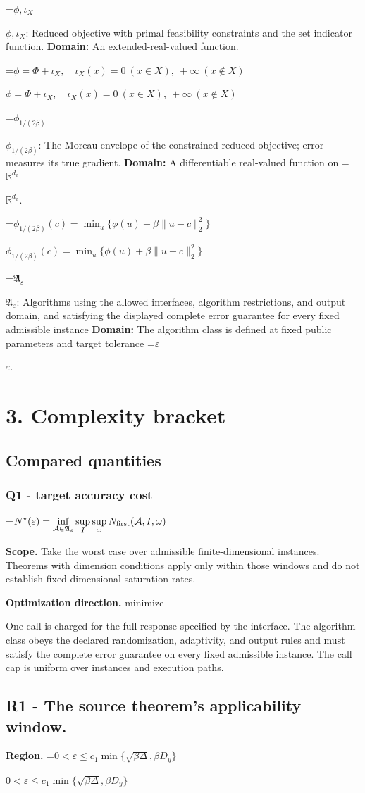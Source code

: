 \documentclass[10pt,a4paper]{article}
\newcommand{\AtlasMath}[1]{\par\begingroup\centering\setbox0=\hbox{$\displaystyle #1$}\ifdim\wd0>1.4\linewidth\typeout{ATLAS WIDE FORMULA: \the\wd0}\fi\ifdim\wd0>\linewidth\resizebox{\linewidth}{!}{\box0}\else\box0\fi\par\endgroup}
\newcommand{\AtlasInlineMath}[1]{\begingroup\setbox0=\hbox{$#1$}\ifdim\wd0>.4\linewidth\endgroup\AtlasMath{#1}\else\endgroup$#1$\fi}
\begin{document}
\AtlasInlineMath{\phi,\iota_X}: Reduced objective with primal feasibility constraints and the set indicator function. \textbf{Domain:} An extended-real-valued function.

\AtlasInlineMath{\phi=\Phi+\iota_X,\quad\iota_X(x)=0\ (x\in X),\ +\infty\ (x\notin X)}

\AtlasInlineMath{\phi_{1/(2\beta)}}: The Moreau envelope of the constrained reduced objective; error measures its true gradient. \textbf{Domain:} A differentiable real-valued function on \AtlasInlineMath{\mathbb R^{d_x}}.

\AtlasInlineMath{\phi_{1/(2\beta)}(c)=\min_u\{\phi(u)+\beta\|u-c\|_2^2\}}

\AtlasInlineMath{\mathfrak A_\varepsilon}: Algorithms using the allowed interfaces, algorithm restrictions, and output domain, and satisfying the displayed complete error guarantee for every fixed admissible instance \textbf{Domain:} The algorithm class is defined at fixed public parameters and target tolerance \AtlasInlineMath{\varepsilon}.

\section{3. Complexity bracket}
\subsection{Compared quantities}
\subsubsection{Q1 - target accuracy cost}
\AtlasMath{N^\star(\varepsilon)=\inf_{\mathcal A\in\mathfrak A_\varepsilon}\sup_I \sup_\omega N_{\rm first}(\mathcal A,I,\omega)}
\textbf{Scope.} Take the worst case over admissible finite-dimensional instances. Theorems with dimension conditions apply only within those windows and do not establish fixed-dimensional saturation rates.

\textbf{Optimization direction.} minimize

One call is charged for the full response specified by the interface. The algorithm class obeys the declared randomization, adaptivity, and output rules and must satisfy the complete error guarantee on every fixed admissible instance. The call cap is uniform over instances and execution paths.

\subsection{R1 - The source theorem’s applicability window.}
\textbf{Region.} \AtlasInlineMath{0<\varepsilon\le c_1\min\{\sqrt{\beta\Delta},\beta D_y\}}
\end{document}
